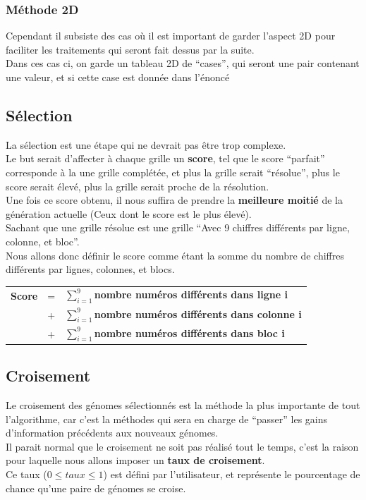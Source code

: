             \subsubsection{Méthode 2D}
                Cependant il subsiste des cas où il est important de garder l'aspect 2D pour faciliter les traitements qui seront fait dessus par la suite.\\
                Dans ces cas ci, on garde un tableau 2D de ``cases'', qui seront une pair contenant une valeur, et si cette case est donnée dans l'énoncé
        \subsection{Sélection}
            La sélection est une étape qui ne devrait pas être trop complexe.\\
            Le but serait d'affecter à chaque grille un \textbf{score}, tel que le score ``parfait'' corresponde à la une grille complétée, et plus la grille serait ``résolue'', plus le score serait élevé, plus la grille serait proche de la résolution.\\

            Une fois ce score obtenu, il nous suffira de prendre la \textbf{meilleure moitié} de la génération actuelle (Ceux dont le score est le plus élevé).\\

            Sachant que une grille résolue est une grille ``Avec 9 chiffres différents par ligne, colonne, et bloc''.\\
            Nous allons donc définir le score comme étant la somme du nombre de chiffres différents par lignes, colonnes, et blocs.

            \begin{center}
                \begin{tabular}{rcl}
                    \textbf{Score}&=&$\sum_{i=1}^9$\textbf{nombre numéros différents dans ligne i}\\
                        &+&$\sum_{i=1}^9$\textbf{nombre numéros différents dans colonne i}\\
                        &+&$\sum_{i=1}^9$\textbf{nombre numéros différents dans bloc i}
                \end{tabular}
            \end{center}
        \subsection{Croisement}
            Le croisement des génomes sélectionnés est la méthode la plus importante de tout l'algorithme, car c'est la méthodes qui sera en charge de ``passer'' les gains d'information précédents aux nouveaux génomes.\\
            Il parait normal que le croisement ne soit pas réalisé tout le temps, c'est la raison pour laquelle nous allons imposer un \textbf{taux de croisement}.\\
            Ce taux ($0\leq taux\leq 1$) est défini par l'utilisateur, et représente le pourcentage de chance qu'une paire de génomes se croise.\\

